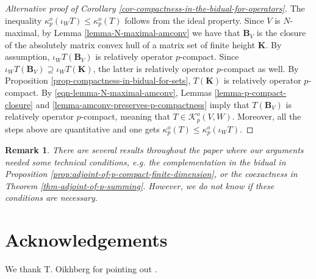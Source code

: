 \documentclass[11pt]{amsart}
\newtheorem{remark}[theorem]{Remark}
\numberwithin{equation}{section}
\begin{document}
\begin{proof}[Alternative proof of Corollary \ref{cor-compactness-in-the-bidual-for-operators}]
The inequality $\kappa_p^o(\iota_WT) \le \kappa_p^o(T)$ follows from the ideal property.
Since $V$ is $N$-maximal, by Lemma \ref{lemma-N-maximal-amconv} we have that $\mathbf{B}_V$ is the closure of the absolutely matrix convex hull of a matrix set of finite height $\mathbf{K}$.
By assumption, $\iota_W T(\mathbf{B}_V)$ is relatively operator $p$-compact. Since $
\iota_W T(\mathbf{B}_V) \supseteq  \iota_W T(\mathbf{K})$, the latter is relatively operator $p$-compact as well.
By Proposition \ref{prop-compactness-in-bidual-for-sets}, $T(\mathbf{K})$ is relatively operator $p$-compact. By \eqref{eqn-lemma-N-maximal-amconv},
Lemmas \ref{lemma-p-compact-closure} and \ref{lemma-amconv-preserves-p-compactness} imply that $T(\mathbf{B}_V)$ is relatively operator $p$-compact, meaning that $T\in\mathcal{K}_p^o(V,W)$. Moreover, all the steps above are quantitative and one gets $ \kappa_p^o(T) \le \kappa_p^o(\iota_WT)$. 
\end{proof}

\begin{remark}
There are several results throughout the paper where our arguments needed some technical conditions, e.g. the complementation in the bidual in Proposition \ref{prop:adjoint-of-p-compact-finite-dimension}, or the coexactness in Theorem \ref{thm-adjoint-of-p-summing}.
However, we do not know if these conditions are necessary.
\end{remark}

\section*{Acknowledgements}

We thank T. Oikhberg for pointing out \cite[Example 3.3.1.3]{Junge-Habilitationschrift}.
\end{document}
